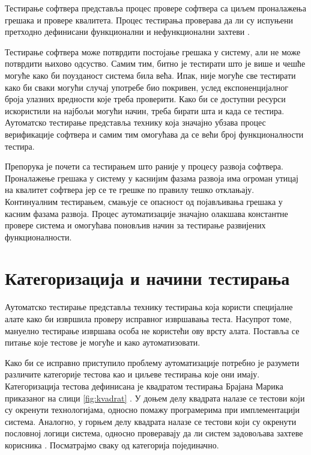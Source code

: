 \documentclass[12pt,oneside]{memoir}
\begin{document}
Тестирање софтвера представља процес провере софтвера са циљем проналажења грешака и провере квалитета. Процес тестирања проверава да ли су испуњени претходно дефинисани функционални и нефункционални захтеви \cite{ISTQB}.

Тестирање софтвера може потврдити постојање грешака у систему, али не може потврдити њихово одсуство. Самим тим, битно је тестирати што је више и чешће могуће како би поузданост система била већа. Ипак, није могуће све тестирати како би сваки могући случај употребе био покривен, услед експоненцијалног броја улазних вредности које треба проверити. Како би се доступни ресурси искористили на најбољи могући начин, треба бирати шта и када се тестира. Аутоматско тестирање представља технику која значајно убзава процес верификације софтвера и самим тим омогућава да се већи број функционалности тестира.

Препорука је почети са тестирањем што раније у процесу развоја софтвера. Проналажење грешака у систему у каснијим фазама развоја има огроман утицај на квалитет софтвера јер се те грешке по правилу тешко отклањају. Континуалним тестирањем, смањује се опасност од појављивања грешака у касним фазама развоја. Процес аутоматизације значајно олакшава константне провере система и омогућава поновљив начин за тестирање развијених функционалности.


\section{Категоризација и начини тестирања}

Аутоматско тестирање представља технику тестирања која користи специјалне алате како би извршила проверу исправног извршавања теста. Насупрот томе, мануелно тестирање извршава особа не користећи ову врсту алата. Поставља се питање које тестове је могуће и како аутоматизовати.

Како би се исправно приступило проблему аутоматизације потребно је разумети различите категорије тестова као и циљеве тестирања које они имају. Категоризација тестова дефинисана је квадратом тестирања Брајана Марика приказаног на слици \ref{fig:kvadrat} \cite{testiranjeBook}. У доњем делу квадрата налазе се тестови који су окренути технологијама, односно помажу програмерима при имплементацији система. Аналогно, у горњем делу квадрата налазе се тестови који су окренути пословној логици система, односно проверавају да ли систем задовољава захтеве корисника \cite{microservicesBook}. Посматрајмо сваку од категорија појединачно.
\end{document}
